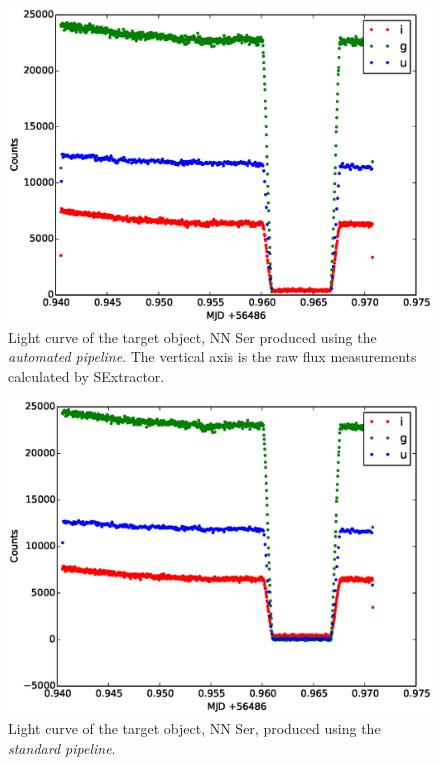 \begin{figure}[!h]
\centering
\includegraphics[width=140mm]{images/nnser_lightcurve_automated.eps}
\caption{Light curve of the target object, NN Ser produced using the \emph{automated pipeline}. The vertical axis is the raw flux measurements calculated by SExtractor.}
\label{fig:nnserlightcurveautomated}
\end{figure}

\begin{figure}[!h]
\centering
\includegraphics[width=140mm]{images/nnser_lightcurve_tom.eps}
\caption{Light curve of the target object, NN Ser, produced using the \emph{standard pipeline}. }
\label{fig:nnserlightcurvetom}
\end{figure}

